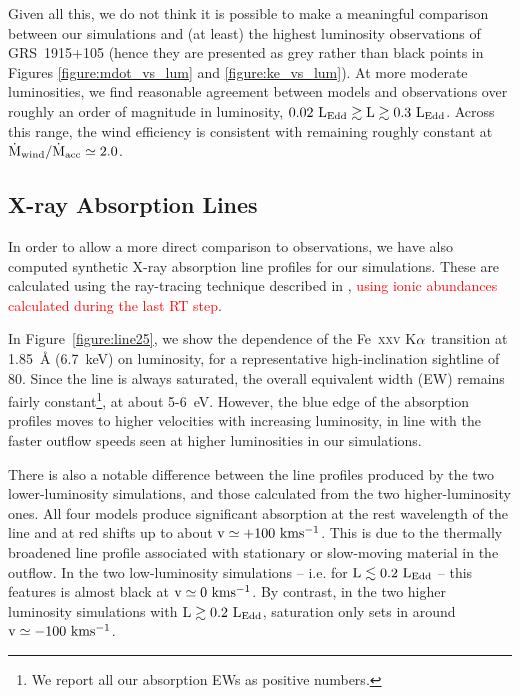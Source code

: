\documentclass[a4paper,fleqn,usenatbib]{mnras}
\begin{document}
Given all this, we do not think it is possible to make a meaningful
comparison between our simulations and (at least) the highest
luminosity observations of GRS~1915+105 (hence they are presented
as grey rather than black points in Figures \ref{figure:mdot_vs_lum}
and \ref{figure:ke_vs_lum}). At more moderate luminosities, 
we find reasonable agreement between models and observations over 
roughly an order of magnitude in luminosity,
$\rm{0.02~L_{Edd} \gtrsim L \gtrsim 0.3~L_{Edd}}$. Across this range,
the wind efficiency is consistent with remaining roughly constant at
$\rm{\dot{M}_{wind}/\dot{M}_{acc}} \simeq 2.0$. 

\subsection{X-ray Absorption Lines}
\label{lines}

In order to allow a more direct comparison to observations, we have
also computed synthetic X-ray absorption line profiles for our
simulations. These are calculated using the ray-tracing technique described in
\cite{2017ApJ...836...42H}, \textcolor{red}{using ionic abundances calculated
during the last RT step}.

In Figure~\ref{figure:line25}, we show the dependence of the
Fe~\textsc{xxv} K$\rm{\alpha}$ transition at 1.85~{\AA} (6.7~keV)
on luminosity, for a representative high-inclination sightline of
80\degree. Since the 
line is always saturated, the overall equivalent width (EW) remains
fairly constant\footnote{We report all our absorption
EWs as positive numbers.}, at about 5-6~eV. However, the blue edge of 
the absorption profiles moves to higher velocities with increasing
luminosity, in line with the faster outflow speeds seen at higher
luminosities in our simulations. 

There is also a notable difference between the line profiles produced
by the two lower-luminosity simulations, and those calculated from the
two higher-luminosity ones. All four models produce significant
absorption at the rest wavelength of the line and at red shifts up to 
about $\rm{v \simeq +100~kms^{-1}}$. This is due to the thermally
broadened line profile associated with stationary or slow-moving
material in the outflow. In the two low-luminosity simulations --
i.e. for $\rm{L \lesssim 0.2~L_{Edd}}$ -- this features is almost black
at $\rm{v \simeq 0~kms^{-1}}$. By contrast, in the two higher
luminosity simulations with $\rm{L \gtrsim 0.2~L_{Edd}}$, saturation 
only sets in around $\rm{v \simeq -100~kms^{-1}}$.
\end{document}
